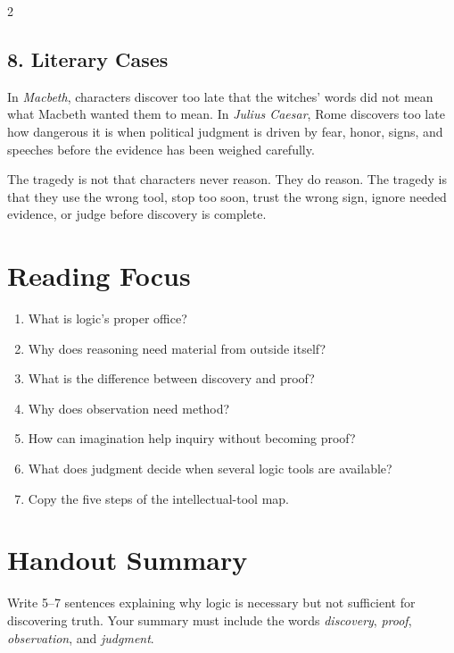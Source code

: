 \documentclass[12pt]{article}
\begin{document}
\begin{multicols}{2}
\subsection*{8. Literary Cases}
In \textit{Macbeth}, characters discover too late that the witches' words did not mean what Macbeth wanted them to mean. In \textit{Julius Caesar}, Rome discovers too late how dangerous it is when political judgment is driven by fear, honor, signs, and speeches before the evidence has been weighed carefully.

The tragedy is not that characters never reason. They do reason. The tragedy is that they use the wrong tool, stop too soon, trust the wrong sign, ignore needed evidence, or judge before discovery is complete.

\section*{Reading Focus}
\begin{enumerate}[leftmargin=*]
\item What is logic's proper office?
\item Why does reasoning need material from outside itself?
\item What is the difference between discovery and proof?
\item Why does observation need method?
\item How can imagination help inquiry without becoming proof?
\item What does judgment decide when several logic tools are available?
\item Copy the five steps of the intellectual-tool map.
\end{enumerate}

\section*{Handout Summary}
Write 5--7 sentences explaining why logic is necessary but not sufficient for discovering truth. Your summary must include the words \textit{discovery}, \textit{proof}, \textit{observation}, and \textit{judgment}.
\end{multicols}
\end{document}
